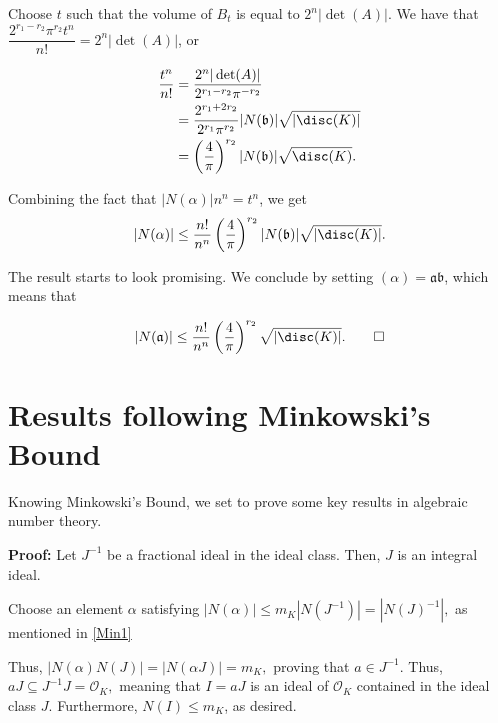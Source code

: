 \documentclass[a4paper, 12pt,oneside,openany]{book}
\begin{document}
Choose $t$ such that the volume of $B_t$ is equal to $2^n |\det(A)|.$ We have that $\dfrac{2^{r_1-r_2}\pi^{r_2}t^n}{n!}=2^n|\det(A)|$, or 

\begin{align*}
    \frac{t^n}{n!}&=\frac{2^n|\det(A)|}{2^{r_1-r_2}\pi^{-r_2}}\\
    &= \frac{2^{r_1+2r_2}}{2^{r_1}\pi^{r_2}} |N(\mathfrak{b})| \sqrt{|\disc(K)|} \\
    &=\left(\frac{4}{\pi}\right)^{r_2} |N({\mathfrak{b})|\sqrt{\disc(K)}}.
\end{align*}

Combining the fact that $|N(\alpha)|n^n=t^n$, we get 
\begin{equation} \label{Min1}
     |N(\alpha)| \leq \frac{n!}{n^n}\left(\frac{4}{\pi}\right)^{r_2} |N({\mathfrak{b})|\sqrt{|\disc(K)|}}.  
\end{equation}
    
The result starts to look promising. We conclude by setting $(\alpha)=\mathfrak{a}\mathfrak{b}$, which means that  

\begin{equation}
    |N(\mathfrak{a})| \leq \frac{n!}{n^n}\left(\frac{4}{\pi}\right)^{r_2}\sqrt{|\disc(K)|}. \qed
\end{equation} \newpage

\section{Results following Minkowski's Bound}

Knowing Minkowski's Bound, we set to prove some key results in algebraic number theory.


\textbf{Proof:} Let $J^{-1}$ be a fractional ideal in the ideal class. Then, $J$ is an integral ideal.

Choose an element $\alpha$ satisfying $|N(\alpha)| \leq m_K |N(J^{-1})|=|N(J)^{-1}|,$ as mentioned in \ref{Min1}

Thus, $|N(\alpha)N(J)| = |N(\alpha J)|=m_K,$ proving that $a \in J^{-1}.$ Thus, $aJ \subseteq J^{-1}J = \mathcal{O}_K,$ meaning that $I=aJ$ is an ideal of $\mathcal{O}_K$ contained in the ideal class $J.$ Furthermore, $N(I) \leq m_K$, as desired.

\end{document}
